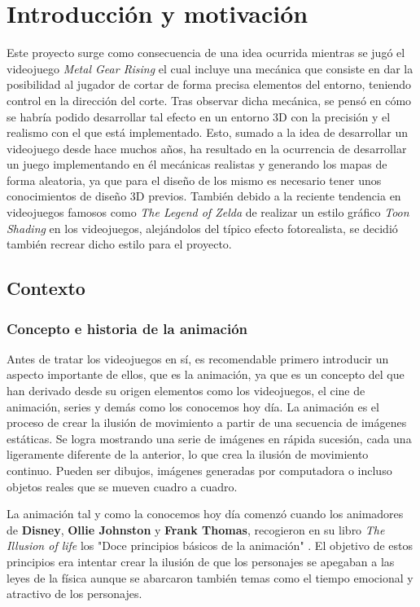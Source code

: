 \chapter{Introducción y motivación}

Este proyecto surge como consecuencia de una idea ocurrida mientras se jugó el videojuego \textit{Metal Gear Rising} el cual incluye una mecánica que consiste en dar la posibilidad al jugador de cortar de forma precisa elementos del entorno, teniendo control en la dirección del corte. Tras observar dicha mecánica, se pensó en cómo se habría podido desarrollar tal efecto en un entorno 3D con la precisión y el realismo con el que está implementado. Esto, sumado a la idea de desarrollar un videojuego desde hace muchos años, ha resultado en la ocurrencia de desarrollar un juego implementando en él mecánicas realistas y generando los mapas de forma aleatoria, ya que para el diseño de los mismo es necesario tener unos conocimientos de diseño 3D previos. También debido a la reciente tendencia en videojuegos famosos como \textit{The Legend of Zelda} de realizar un estilo gráfico \textit{Toon Shading} en los videojuegos, alejándolos del típico efecto fotorealista, se decidió también recrear dicho estilo para el proyecto. 

\section{Contexto}

\subsection{Concepto e historia de la animación}

Antes de tratar los videojuegos en sí, es recomendable primero introducir un aspecto importante de ellos, que es la animación, ya que es un concepto del que han derivado desde su origen elementos como los videojuegos, el cine de animación, series y demás como los conocemos hoy día. La animación es el proceso de crear la ilusión de movimiento a partir de una secuencia de imágenes estáticas. Se logra mostrando una serie de imágenes en rápida sucesión, cada una ligeramente diferente de la anterior, lo que crea la ilusión de movimiento continuo. Pueden ser dibujos, imágenes generadas por computadora o incluso objetos reales que se mueven cuadro a cuadro.

La animación \cite{Animacion} tal y como la conocemos hoy día comenzó cuando los animadores de \textbf{Disney}, \textbf{Ollie Johnston} y \textbf{Frank Thomas}, recogieron en su libro \textit{The Illusion of life} los "Doce principios básicos de la animación" \cite{TheIllusionOfLife}. El objetivo de estos principios era intentar crear la ilusión de que los personajes se apegaban a las leyes de la física aunque se abarcaron también temas como el tiempo emocional y atractivo de los personajes. 

